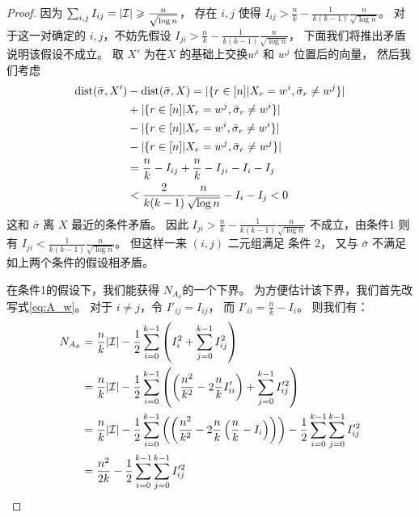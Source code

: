 \begin{proof}
    因为 $\sum_{i,j} I_{ij} = |\mathcal{I}| \geqslant \frac{n}{\sqrt{\log n}}$，
    存在 $i,j$ 使得
    $I_{ij} > \frac{n}{k} - \frac{1}{k(k-1)}\frac{n}{\sqrt{\log n}}$。
    对于这一对确定的 $i,j$，不妨先假设 $I_{ji} > \frac{n}{k} - \frac{1}{k(k-1)}\frac{n}{\sqrt{\log n}}$，
    下面我们将推出矛盾说明该假设不成立。
    取 $X'$ 为在$X$ 的基础上交换$w^i$ 和 $w^j$ 位置后的向量，
    然后我们考虑
  \begin{align}
     \operatorname{dist}(\bar{\sigma}, X') & - \operatorname{dist}(\bar{\sigma}, X)= |\{ r \in [n]|X_r=w^i, \bar{\sigma}_r \neq w^j \}| \notag\\
    &+ |\{ r \in [n]|X_r=w^j, \bar{\sigma}_r \neq w^i \}| \notag\\
    &-|\{ r \in [n]|X_r=w^i, \bar{\sigma}_r \neq w^i \}| \notag\\
    &- |\{ r \in [n]|X_r=w^j, \bar{\sigma}_r \neq w^j \}| \notag\\
    & = \frac{n}{k} - I_{ij} +  \frac{n}{k} - I_{ji} - I_i - I_j\label{eq:distsmall} \\
    & < \frac{2}{k(k-1)}\frac{n}{\sqrt{\log n}} - I_i - I_j < 0\notag
    \end{align}
    这和 $\bar{\sigma}$ 离 $X$ 最近的条件矛盾。
    因此
    $I_{ji} > \frac{n}{k} - \frac{1}{k(k-1)}\frac{n}{\sqrt{\log n}}$
    不成立，由条件1
    则有  $I_{ji} < \frac{1}{k(k-1)}\frac{n}{\sqrt{\log n}}$。
    但这样一来 $(i, j)$ 二元组满足 条件 2，
    又与 $\bar{\sigma}$ 不满足如上两个条件的假设相矛盾。
    
    在条件1的假设下，我们能获得 $N_{A_{\bar{\sigma}}}$的一个下界。
    为方便估计该下界，我们首先改写式\eqref{eq:A_w}。
    对于 $i\neq j$，令 $I'_{ij} = I_{ij}$，
    而 $I'_{ii} = \frac{n}{k} - I_i$。
    则我们有：
    \begin{align*}
    N_{A_{\bar{\sigma}}} &=
    \frac{n}{k}|\mathcal{I}| - \frac{1}{2}\sum_{i=0}^{k-1}
    \left(I^2_i + \sum_{j=0}^{k-1} I^2_{ij} \right) \\
    &=
    \frac{n}{k}|\mathcal{I}| - \frac{1}{2}\sum_{i=0}^{k-1}
    \left(\left(\frac{n^2}{k^2} - 2\frac{n}{k} I'_{ii} \right) +
    \sum_{j=0}^{k-1} I'^2_{ij} \right) \\
    &=
    \frac{n}{k}|\mathcal{I}| - \frac{1}{2}\sum_{i=0}^{k-1}
    \left(\left(\frac{n^2}{k^2} - 2\frac{n}{k} \left(\frac{n}{k} - I_i\right)\right)\right)
    - \frac{1}{2}\sum_{i=0}^{k-1}\sum_{j=0}^{k-1} I'^2_{ij} \\
    &= \frac{n^2}{2k} - \frac{1}{2}
    \sum_{i=0}^{k-1} \sum_{j=0}^{k-1} I'^2_{ij}
   \end{align*}
    

\end{proof}
